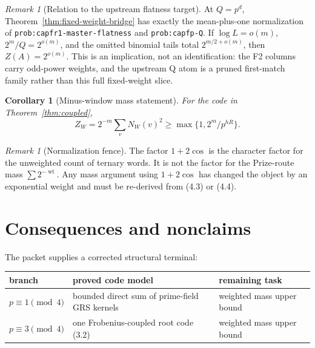 \documentclass[11pt,a4paper]{amsart}
\newtheorem{corollary}[theorem]{Corollary}
\theoremstyle{remark}
\newtheorem{remark}[theorem]{Remark}
\newcommand{\wt}{\operatorname{wt}}
\begin{document}
\begin{remark}[Relation to the upstream flatness target]
At \(Q=p^d\), Theorem~\ref{thm:fixed-weight-bridge} has exactly the
mean-plus-one normalization of \texttt{prob:capfr1-master-flatness} and
\texttt{prob:capfp-Q}.  If \(\log L=o(m)\), \(2^m/Q=2^{o(m)}\), and the
omitted binomial tails total \(2^{m/2+o(m)}\), then \(Z(A)=2^{o(m)}\).
This is an implication, not an identification: the F2 columns carry
odd-power weights, and the upstream Q atom is a pruned first-match family
rather than this full fixed-weight slice.
\end{remark}

\begin{corollary}[Minus-window mass statement]
For the code in Theorem~\ref{thm:coupled},
\[
 Z_W=2^{-m}\sum_vN_W(v)^2
 \ge\max\{1,2^m/p^{hR}\}.
\]
\end{corollary}

\begin{remark}[Normalization fence]
The factor $1+2\cos$ is the character factor for the unweighted count of
ternary words.  It is not the factor for the Prize-route mass
$\sum2^{-\wt}$.  Any mass argument using $1+2\cos$ has changed the object by
an exponential weight and must be re-derived from (4.3) or (4.4).
\end{remark}

\section{Consequences and nonclaims}

The packet supplies a corrected structural terminal:
\begin{center}
\begin{tabular}{@{}lll@{}}
\toprule
branch & proved code model & remaining task\\
\midrule
$p\equiv1\pmod4$ & bounded direct sum of prime-field GRS kernels
  & weighted mass upper bound\\
$p\equiv3\pmod4$ & one Frobenius-coupled root code (3.2)
  & weighted mass upper bound\\
\bottomrule
\end{tabular}
\end{center}
\end{document}
